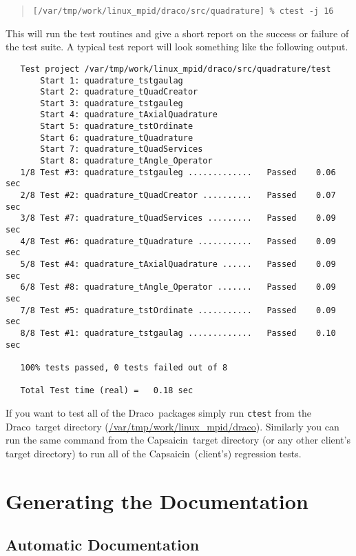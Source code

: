 \documentclass[11pt]{nmemo}
\newcommand{\comp}[1]{\normalfont\footnotesize\texttt{#1}\normalsize}
\newcommand{\draco}{{\normalfont\sffamily Draco}}
\newcommand{\capsaicin}{{\normalfont\sffamily Capsaicin}}
\begin{document}
\footnotesize
\begin{verse}
\texttt{[/var/tmp/work/linux\_mpid/draco/src/quadrature] \% ctest -j 16}
\end{verse}
\normalsize

This will run the test routines and give a short report on the success
or failure of the test suite.  A typical test report will look something
like the following output.

\footnotesize
\begin{verbatim}
   Test project /var/tmp/work/linux_mpid/draco/src/quadrature/test
       Start 1: quadrature_tstgaulag
       Start 2: quadrature_tQuadCreator
       Start 3: quadrature_tstgauleg
       Start 4: quadrature_tAxialQuadrature
       Start 5: quadrature_tstOrdinate
       Start 6: quadrature_tQuadrature
       Start 7: quadrature_tQuadServices
       Start 8: quadrature_tAngle_Operator
   1/8 Test #3: quadrature_tstgauleg .............   Passed    0.06 sec
   2/8 Test #2: quadrature_tQuadCreator ..........   Passed    0.07 sec
   3/8 Test #7: quadrature_tQuadServices .........   Passed    0.09 sec
   4/8 Test #6: quadrature_tQuadrature ...........   Passed    0.09 sec
   5/8 Test #4: quadrature_tAxialQuadrature ......   Passed    0.09 sec
   6/8 Test #8: quadrature_tAngle_Operator .......   Passed    0.09 sec
   7/8 Test #5: quadrature_tstOrdinate ...........   Passed    0.09 sec
   8/8 Test #1: quadrature_tstgaulag .............   Passed    0.10 sec
   
   100% tests passed, 0 tests failed out of 8
   
   Total Test time (real) =   0.18 sec
\end{verbatim}
\normalsize

If you want to test all of the \draco\ packages simply run
\comp{ctest} from the \draco\ target directory
(\url{/var/tmp/work/linux_mpid/draco}).  Similarly you can run the
same command from the \capsaicin\ target directory (or any other
client's target directory) to run all of the \capsaicin\ (client's)
regression tests.


\section{Generating the Documentation}

\subsection{Automatic Documentation}
\end{document}
